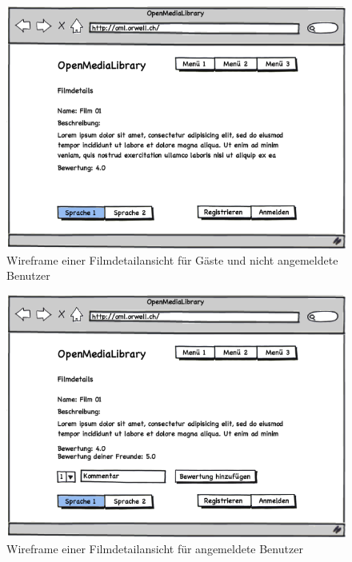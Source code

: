 \begin{figure}[p]
    \begin{center}
        \includegraphics[width=1\textwidth,angle=0]{./wireframes/04_02_detail.png}
        \caption{Wireframe einer Filmdetailansicht für Gäste und nicht angemeldete Benutzer}
        \label{04_02_detail}
    \end{center}
\end{figure}

\begin{figure}[p]
    \begin{center}
        \includegraphics[width=1\textwidth,angle=0]{./wireframes/04_03_detail_angemeldet.png}
        \caption{Wireframe einer Filmdetailansicht für angemeldete Benutzer}
        \label{04_03_detail_angemeldet}
    \end{center}
\end{figure}

